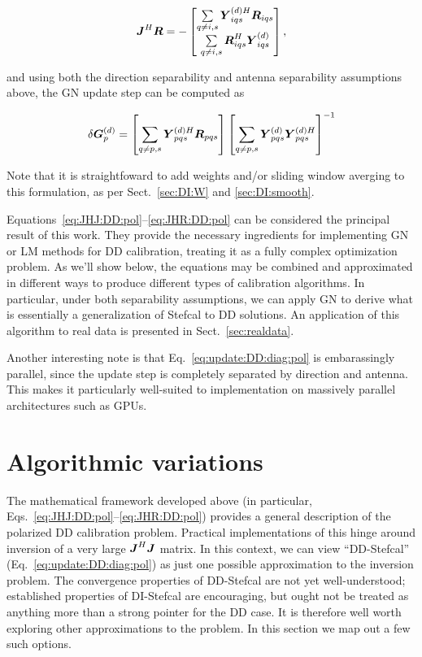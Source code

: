 \documentclass[useAMS,usenatbib]{mn2e}
\newcommand{\mat}[1]{{\bmath{#1}}}
\newcommand{\JJ}{\mat{J}} %
\newcommand{\RR}{\mat{R}}
\newcommand{\JHJ}{\JJ^H\JJ} %
\begin{document}
\begin{equation}
\label{eq:JHR:DD:pol}
\JJ^H\bmath{R} = -\Matrix{c}{
\sum\limits_{q\ne i,s} \YYdH_{iqs} \RR_{iqs} \\
\sum\limits_{q\ne i,s} \RR^H_{iqs} \YYd_{iqs}  } 
,
\end{equation}

and using both the direction separability and antenna separability assumptions above, the GN update step can be computed as

\begin{equation}
\label{eq:update:DD:diag:pol}
\delta \GGd_p = \left [ \sum\limits_{q\ne p,s} \YYdH_{pqs} \RR_{pqs} \right ] 
\left [ \sum\limits_{q\ne p,s} \YYd_{pqs} \YYdH_{pqs}  \right ]^{-1}
\end{equation}

Note that it is straightfoward to add weights and/or sliding window averging to this formulation, as per 
Sect.~\ref{sec:DI:W} and \ref{sec:DI:smooth}.

Equations~\ref{eq:JHJ:DD:pol}--\ref{eq:JHR:DD:pol} can be considered the principal result of this work.
They provide the necessary ingredients for implementing GN or LM methods for DD calibration, treating it as a 
fully complex optimization problem. As we'll show below, the equations may be combined and approximated in different 
ways to produce different types of calibration algorithms. In particular, under both separability assumptions, we can 
apply GN to derive what is essentially a generalization of Stefcal to DD solutions. An application of this algorithm to 
real data is presented in Sect.~\ref{sec:realdata}.

Another interesting note is that Eq.~\ref{eq:update:DD:diag:pol} is embarassingly parallel, since the update step is 
completely separated by direction and antenna. This makes it particularly well-suited to implementation on massively 
parallel architectures such as GPUs.

\section{Algorithmic variations}

The mathematical framework developed above (in particular, Eqs.~\ref{eq:JHJ:DD:pol}--\ref{eq:JHR:DD:pol}) provides
a general description of the polarized DD calibration problem. Practical implementations of this hinge around inversion of
a very large $\JHJ$ matrix. In this context, we can view ``DD-Stefcal'' (Eq.~\ref{eq:update:DD:diag:pol}) as just one 
possible approximation to the inversion problem. The convergence properties of 
DD-Stefcal are not yet well-understood; established properties of DI-Stefcal \citep{Stefcal} are encouraging, but ought not 
be treated as anything more than a strong pointer for the DD case. It is therefore well worth exploring other approximations to 
the problem. In this section we map out a few such options.
\end{document}
